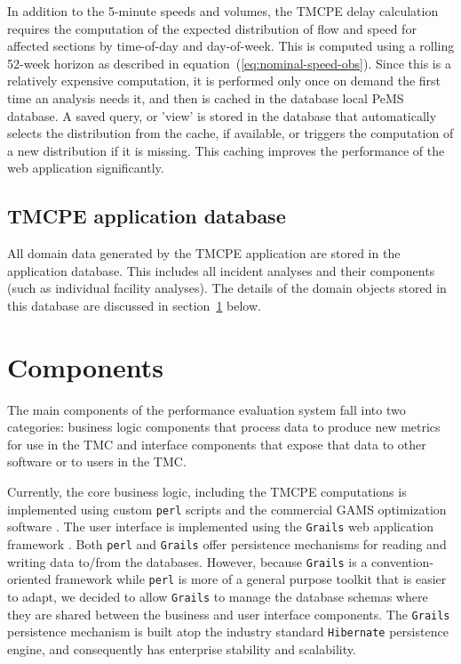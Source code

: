 \documentclass[12pt]{report}
\newcounter{time}
\begin{document}
In addition to the 5-minute speeds and volumes, the \ac{TMCPE} delay calculation
requires the computation of the expected distribution of flow and speed for
affected sections by time-of-day and day-of-week.  This is computed using a
rolling 52-week horizon as described in equation~(\ref{eq:nominal-speed-obs}).
Since this is a relatively expensive computation, it is performed only once on
demand the first time an analysis needs it, and then is cached in the database
local \ac{PeMS} database.  A saved query, or 'view' is stored in the database
that automatically selects the distribution from the cache, if available, or
triggers the computation of a new distribution if it is missing.  This caching
improves the performance of the web application significantly.


\subsection{TMCPE application database}
\label{sec:tmcpe-app-database}

All domain data generated by the \ac{TMCPE} application are stored in the
application database.  This includes all incident analyses and their components
(such as individual facility analyses).  The details of the domain objects
stored in this database are discussed in section~\ref{sec:components} below.


\section{Components}
\label{sec:components}

The main components of the performance evaluation system fall into two
categories: business logic components that process data to produce new metrics
for use in the \ac{TMC} and interface components that expose that data to other
software or to users in the \ac{TMC}.  

Currently, the core business logic, including the \ac{TMCPE} computations is
implemented using custom \texttt{perl} scripts and the commercial
\ac{GAMS} optimization software \citep{GAMS}.  The user interface is implemented
using the \texttt{Grails} web application framework \citep{grails}.  Both
\texttt{perl} and \texttt{Grails} offer persistence mechanisms for reading and
writing data to/from the databases.  However, because \texttt{Grails} is a
convention-oriented framework while \texttt{perl} is more of a general purpose
toolkit that is easier to adapt, we decided to allow \texttt{Grails} to manage
the database schemas where they are shared between the business and user
interface components.  The \texttt{Grails} persistence mechanism is built atop
the industry standard \texttt{Hibernate} persistence
\citep{king10:_hiber_relat_persis_idiom_java} engine, and consequently has
enterprise stability and scalability.
\end{document}
